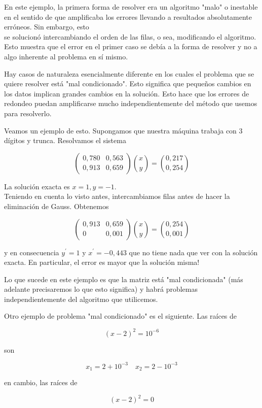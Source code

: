 \documentclass[10pt]{book}
\begin{document}
En este ejemplo, la primera forma de resolver era un algoritmo "malo" o inestable en el sentido de que amplificaba los errores llevando a resultados absolutamente erróneos. Sin embargo, esto\\
se solucionó intercambiando el orden de las filas, o sea, modificando el algoritmo. Esto muestra que el error en el primer caso se debía a la forma de resolver y no a algo inherente al problema en sí mismo.

Hay casos de naturaleza esencialmente diferente en los cuales el problema que se quiere resolver está "mal condicionado". Esto significa que pequeños cambios en los datos implican grandes cambios en la solución. Esto hace que los errores de redondeo puedan amplificarse mucho independientemente del método que usemos para resolverlo.

Veamos un ejemplo de esto. Supongamos que nuestra máquina trabaja con 3 dígitos y trunca. Resolvamos el sistema

$$
\left(\begin{array}{ll}
0,780 & 0,563 \\
0,913 & 0,659
\end{array}\right)\binom{x}{y}=\binom{0,217}{0,254}
$$

La solución exacta es $x=1, y=-1$.\\
Teniendo en cuenta lo visto antes, intercambiamos filas antes de hacer la eliminación de Gauss. Obtenemos

$$
\left(\begin{array}{cc}
0,913 & 0,659 \\
0 & 0,001
\end{array}\right)\binom{x}{y}=\binom{0,254}{0,001}
$$

y en consecuencia $y^{\prime}=1$ y $x^{\prime}=-0,443$ que no tiene nada que ver con la solución exacta. En particular, el error es mayor que la solución misma!

Lo que sucede en este ejemplo es que la matriz está "mal condicionada" (más adelante precisaremos lo que esto significa) y habrá problemas independientemente del algoritmo que utilicemos.

Otro ejemplo de problema "mal condicionado" es el siguiente. Las raíces de

$$
(x-2)^{2}=10^{-6}
$$

son

$$
x_{1}=2+10^{-3} \quad x_{2}=2-10^{-3}
$$

en cambio, las raíces de

$$
(x-2)^{2}=0
$$
\end{document}
